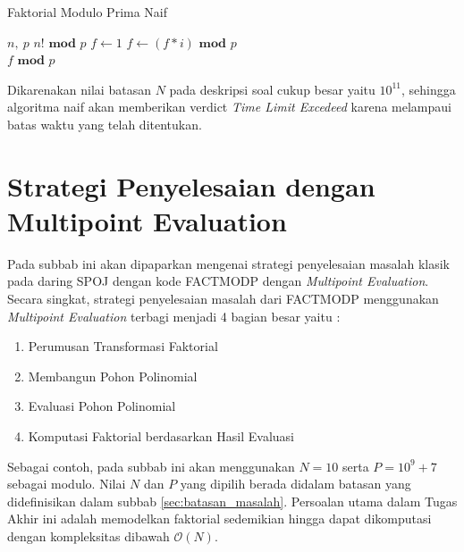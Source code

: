 \begin{algorithm}
	\caption{Faktorial Modulo Prima Naif}
	\label{psdo:factorial_naif}
	\begin{algorithmic}[1]
		\Require $n,\ p$
		\Ensure $n! \textbf{ mod } p$
		\State $f \leftarrow 1$
			\State $ f \leftarrow ( f * i ) \textbf{ mod } p$
		\EndFor \\
		\Return $ f \textbf{ mod } p $
	\end{algorithmic}
\end{algorithm}

Dikarenakan nilai batasan $ N $ pada deskripsi soal cukup besar yaitu $ 10^{11} $, sehingga algoritma naif akan memberikan verdict \textit{Time Limit Excedeed} karena melampaui batas waktu yang telah ditentukan.

\section{Strategi Penyelesaian dengan Multipoint Evaluation}
\label{sec:penyelesaian_multipoint_evaluation}
Pada subbab ini akan dipaparkan mengenai strategi penyelesaian masalah klasik pada daring SPOJ dengan kode FACTMODP dengan \textit{Multipoint Evaluation}. Secara singkat, strategi penyelesaian masalah dari FACTMODP menggunakan \textit{Multipoint Evaluation} terbagi menjadi 4 bagian besar yaitu :
\begin{enumerate}
	\item Perumusan Transformasi Faktorial
	\item Membangun Pohon Polinomial
	\item Evaluasi Pohon Polinomial
	\item Komputasi Faktorial berdasarkan Hasil Evaluasi
\end{enumerate}

Sebagai contoh, pada subbab ini akan menggunakan $ N = 10 $ serta $ P = 10^9 + 7 $ sebagai modulo. Nilai $ N $ dan $ P $ yang dipilih berada didalam batasan yang didefinisikan dalam subbab \ref{sec:batasan_masalah}. Persoalan utama dalam Tugas Akhir ini adalah memodelkan faktorial sedemikian hingga dapat dikomputasi dengan kompleksitas dibawah $ \mathcal{O}{(N)} $.

